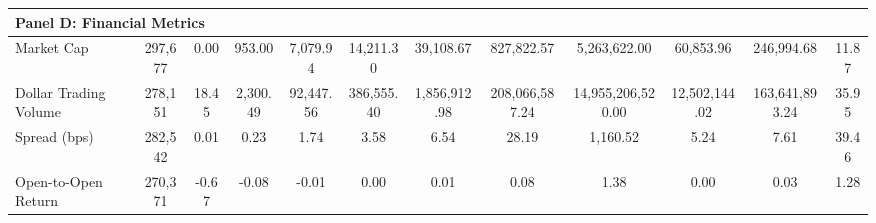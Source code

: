 {\begin{tabular}{l c c c c c c c c c c c}
\hline
\multicolumn{12}{l}{\textbf{Panel D: Financial Metrics}} \\
\hline
Market Cap & 297,677 & 0.00 & 953.00 & 7,079.94 & 14,211.30 & 39,108.67 & 827,822.57 & 5,263,622.00 & 60,853.96 & 246,994.68 & 11.87 \\
Dollar Trading Volume & 278,151 & 18.45 & 2,300.49 & 92,447.56 & 386,555.40 & 1,856,912.98 & 208,066,587.24 & 14,955,206,520.00 & 12,502,144.02 & 163,641,893.24 & 35.95 \\
Spread (bps) & 282,542 & 0.01 & 0.23 & 1.74 & 3.58 & 6.54 & 28.19 & 1,160.52 & 5.24 & 7.61 & 39.46 \\
Open-to-Open Return & 270,371 & -0.67 & -0.08 & -0.01 & 0.00 & 0.01 & 0.08 & 1.38 & 0.00 & 0.03 & 1.28 \\
\hline
\hline
\end{tabular}
}
